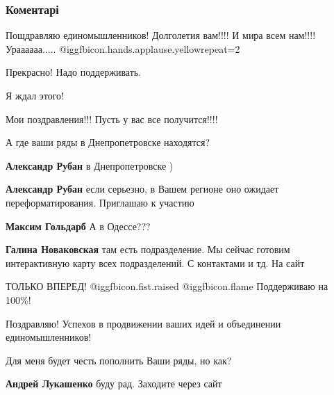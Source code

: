  
 
 
 
 
\subsubsection{Коментарі}
\label{sec:09_12_2021.fb.goldarb_maksim.1.sojuz_levyh_sil.cmt}

\begin{itemize} %

Пощдравляю единомышленников! Долголетия вам!!!! И мира всем нам!!!!
Ураааааа..... @igg{fbicon.hands.applause.yellow}{repeat=2} 

Прекрасно! Надо поддерживать.

Я ждал этого!

Мои поздравления!!! Пусть у вас все получится!!!!

А где ваши ряды в Днепропетровске находятся?

\begin{itemize} %
\textbf{Александр Рубан} в Днепропетровске )

\textbf{Александр Рубан} если серьезно, в Вашем регионе оно ожидает переформатирования. Приглашаю к участию

\textbf{Максим Гольдарб} А в Одессе???

\textbf{Галина Новаковская} там есть подразделение. Мы сейчас готовим интерактивную карту всех подразделений. С контактами и тд. На сайт
\end{itemize} %

ТОЛЬКО ВПЕРЕД!  @igg{fbicon.fist.raised}  @igg{fbicon.flame} 
Поддерживаю на 100\%!

Поздравляю! Успехов в продвижении ваших идей и объединении единомышленников!

Для меня будет честь пополнить Ваши ряды, но как?

\begin{itemize} %
\textbf{Андрей Лукашенко} буду рад. Заходите через сайт


\end{itemize}
\end{itemize}
